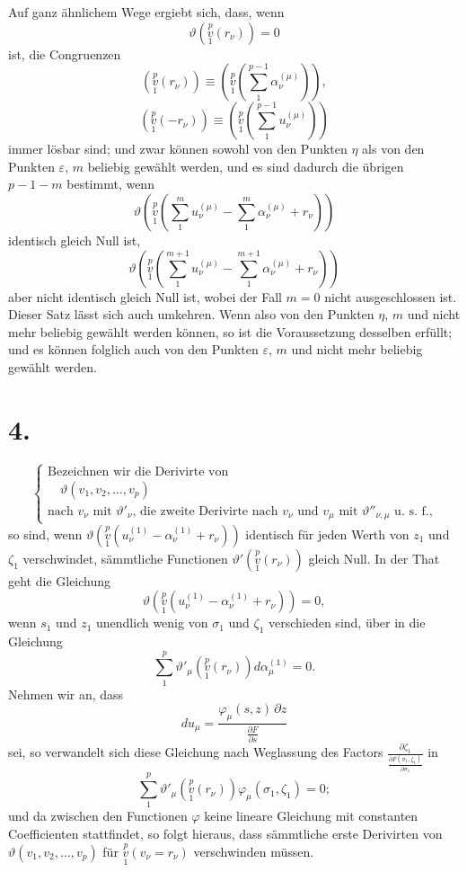 \documentclass{article}
\begin{document}
Auf ganz ähnlichem Wege ergiebt sich, dass, wenn
\[
\vartheta\left(\overset{p}{\underset{1}{v}}(r_\nu)\right) = 0
\]
ist, die Congruenzen
\[
\tag{(4.)}
\left(\overset{p}{\underset{1}{v}}(r_\nu)\right) \equiv \left(\overset{p}{\underset{1}{v}}\left(\sum_1^{p-1} \alpha_\nu^{(\mu)}\right)\right),
\]
\[
\tag{(5.)}
\left(\overset{p}{\underset{1}{v}}(-r_\nu)\right) \equiv \left(\overset{p}{\underset{1}{v}}\left(\sum_1^{p-1} u_\nu^{(\mu)}\right)\right)
\]
immer lösbar sind; und zwar können sowohl von den Punkten $\eta$ als von den Punkten $\varepsilon$, $m$ beliebig gewählt werden, und es sind dadurch die übrigen $p-1-m$ bestimmt, wenn
\[
\vartheta\left(\overset{p}{\underset{1}{v}}\left(\sum_1^m u_\nu^{(\mu)} - \sum_1^m \alpha_\nu^{(\mu)} + r_\nu\right)\right)
\]
identisch gleich Null ist,
\[
\vartheta\left(\overset{p}{\underset{1}{v}}\left(\sum_1^{m+1} u_\nu^{(\mu)} - \sum_1^{m+1} \alpha_\nu^{(\mu)} + r_\nu\right)\right)
\]
aber nicht identisch gleich Null ist, wobei der Fall $m=0$ nicht ausgeschlossen ist. Dieser Satz lässt sich auch umkehren. Wenn also von den Punkten $\eta$, $m$ und nicht mehr beliebig gewählt werden können, so ist die Voraussetzung desselben erfüllt; und es können folglich auch von den Punkten $\varepsilon$, $m$ und nicht mehr beliebig gewählt werden.

\section*{4.}

\[
\tag{(1.)}
\left\{
\begin{array}{l}
\text{Bezeichnen wir die Derivirte von} \\
\quad \vartheta(v_1, v_2, \dots, v_p) \\
\text{nach } v_\nu \text{ mit } \vartheta'_\nu\text{, die zweite Derivirte nach } v_\nu \text{ und } v_\mu \text{ mit } \vartheta''_{\nu,\mu}\text{ u.~s.~f.,}
\end{array}
\right.
\]
so sind, wenn $\vartheta\left(\overset{p}{\underset{1}{v}}(u_\nu^{(1)} - \alpha_\nu^{(1)} + r_\nu)\right)$ identisch für jeden Werth von $z_1$ und $\zeta_1$ verschwindet, sämmtliche Functionen $\vartheta'\left(\overset{p}{\underset{1}{v}}(r_\nu)\right)$ gleich Null. In der That geht die Gleichung
\[
\vartheta\left(\overset{p}{\underset{1}{v}}(u_\nu^{(1)} - \alpha_\nu^{(1)} + r_\nu)\right) = 0,
\]
wenn $s_1$ und $z_1$ unendlich wenig von $\sigma_1$ und $\zeta_1$ verschieden sind, über in die Gleichung
\[
\sum_1^p \vartheta'_\mu\left(\overset{p}{\underset{1}{v}}(r_\nu)\right) d\alpha_\mu^{(1)} = 0.
\]
Nehmen wir an, dass
\[
du_\mu = \frac{\varphi_\mu(s, z)\,\partial z}{\displaystyle\frac{\partial F}{\partial s}}
\]
sei, so verwandelt sich diese Gleichung nach Weglassung des Factors $\displaystyle\frac{\partial \zeta_1}{\displaystyle\frac{\partial F(\sigma_1, \zeta_1)}{\partial \sigma_1}}$ in
\[
\sum_1^p \vartheta'_\mu\left(\overset{p}{\underset{1}{v}}(r_\nu)\right) \varphi_\mu(\sigma_1, \zeta_1) = 0;
\]
und da zwischen den Functionen $\varphi$ keine lineare Gleichung mit constanten Coefficienten stattfindet, so folgt hieraus, dass sämmtliche erste Derivirten von $\vartheta(v_1, v_2, \dots, v_p)$ für $\overset{p}{\underset{1}{v}}(v_\nu = r_\nu)$ verschwinden müssen.
\end{document}
